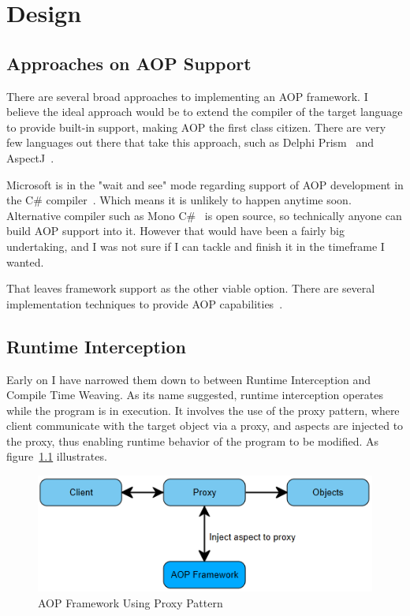 \chapter{Design}

\section{Approaches on AOP Support}

There are several broad approaches to implementing an AOP framework. I believe the ideal approach would be to extend the compiler of the target language to provide built-in support, making AOP the first class citizen. There are very few languages out there that take this approach, such as Delphi Prism~\cite{delphi_prism2010} and AspectJ~\cite{aspectj_faq, aspectj_text}. 

Microsoft is in the "wait and see" mode regarding support of AOP development in the C\# compiler~\cite{hejlsberg}. Which means it is unlikely to happen anytime soon. Alternative compiler such as Mono C\#~\cite{monocsharp} is open source, so technically anyone can build AOP support into it. However that would have been a fairly big undertaking, and I was not sure if I can tackle and finish it in the timeframe I wanted.

That leaves framework support as the other viable option. There are several implementation techniques to provide AOP capabilities~\cite{aopcs, postsharp, aspectcs}.

\section{Runtime Interception}

Early on I have narrowed them down to between Runtime Interception and Compile Time Weaving. As its name suggested, runtime interception operates while the program is in execution. It involves the use of the proxy pattern, where client communicate with the target object via a proxy, and aspects are injected to the proxy, thus enabling runtime behavior of the program to be modified. As figure~\ref{proxy_model} illustrates.

\begin{figure}[H]
  \includegraphics[scale=1.0]{Proxy.PNG}
  \centering
  \caption{AOP Framework Using Proxy Pattern\label{proxy_model}}
\end{figure}

